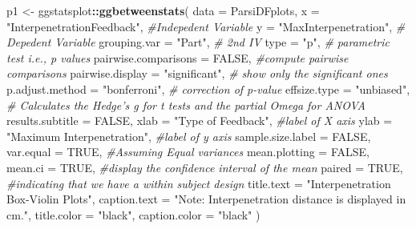 \documentclass[
]{article}
\newenvironment{Shaded}{\begin{snugshade}}{\end{snugshade}}
\newcommand{\CommentTok}[1]{\textcolor[rgb]{0.56,0.35,0.01}{\textit{#1}}}
\newcommand{\DataTypeTok}[1]{\textcolor[rgb]{0.13,0.29,0.53}{#1}}
\newcommand{\KeywordTok}[1]{\textcolor[rgb]{0.13,0.29,0.53}{\textbf{#1}}}
\newcommand{\NormalTok}[1]{#1}
\newcommand{\OperatorTok}[1]{\textcolor[rgb]{0.81,0.36,0.00}{\textbf{#1}}}
\newcommand{\OtherTok}[1]{\textcolor[rgb]{0.56,0.35,0.01}{#1}}
\newcommand{\StringTok}[1]{\textcolor[rgb]{0.31,0.60,0.02}{#1}}
\begin{document}
\begin{Shaded}
\begin{Highlighting}[]
\NormalTok{p1 <-}\StringTok{ }\NormalTok{ggstatsplot}\OperatorTok{::}\KeywordTok{ggbetweenstats}\NormalTok{(}
  \DataTypeTok{data =}\NormalTok{ ParsiDFplots,}
  \DataTypeTok{x =} \StringTok{"InterpenetrationFeedback"}\NormalTok{, }\CommentTok{#Indepedent Variable}
  \DataTypeTok{y =} \StringTok{"MaxInterpenetration"}\NormalTok{, }\CommentTok{# Depedent Variable}
  \DataTypeTok{grouping.var =} \StringTok{"Part"}\NormalTok{, }\CommentTok{# 2nd IV }
  \DataTypeTok{type =} \StringTok{"p"}\NormalTok{, }\CommentTok{# parametric test i.e., p values}
  \DataTypeTok{pairwise.comparisons =} \OtherTok{FALSE}\NormalTok{, }\CommentTok{#compute pairwise comparisons}
  \DataTypeTok{pairwise.display =} \StringTok{"significant"}\NormalTok{, }\CommentTok{# show only the significant ones}
  \DataTypeTok{p.adjust.method =} \StringTok{"bonferroni"}\NormalTok{, }\CommentTok{# correction of p-value}
  \DataTypeTok{effsize.type =} \StringTok{"unbiased"}\NormalTok{, }\CommentTok{# Calculates the Hedge's g for t tests and the partial Omega for ANOVA}
  \DataTypeTok{results.subtitle =} \OtherTok{FALSE}\NormalTok{,}
  \DataTypeTok{xlab =} \StringTok{"Type of Feedback"}\NormalTok{, }\CommentTok{#label of X axis}
  \DataTypeTok{ylab =} \StringTok{"Maximum Interpenetration"}\NormalTok{, }\CommentTok{#label of y axis}
  \DataTypeTok{sample.size.label =} \OtherTok{FALSE}\NormalTok{,}
  \DataTypeTok{var.equal =} \OtherTok{TRUE}\NormalTok{, }\CommentTok{#Assuming Equal variances}
  \DataTypeTok{mean.plotting =} \OtherTok{FALSE}\NormalTok{,}
  \DataTypeTok{mean.ci =} \OtherTok{TRUE}\NormalTok{, }\CommentTok{#display the confidence interval of the mean}
  \DataTypeTok{paired =} \OtherTok{TRUE}\NormalTok{, }\CommentTok{#indicating that we have a within subject design}
  \DataTypeTok{title.text =} \StringTok{"Interpenetration Box-Violin Plots"}\NormalTok{,}
  \DataTypeTok{caption.text =} \StringTok{"Note: Interpenetration distance is displayed in cm."}\NormalTok{,}
  \DataTypeTok{title.color =} \StringTok{"black"}\NormalTok{,}
  \DataTypeTok{caption.color =} \StringTok{"black"}
\NormalTok{  ) }


\end{Highlighting}
\end{Shaded}
\end{document}
